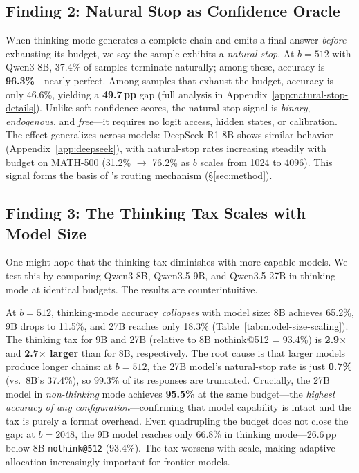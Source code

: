 \subsection{Finding 2: Natural Stop as Confidence Oracle}
\label{sec:finding:natural-stop}

When thinking mode generates a complete chain and emits a final answer \emph{before} exhausting its budget, we say the sample exhibits a \emph{natural stop}.
At $b{=}512$ with Qwen3-8B, 37.4\% of samples terminate naturally; among these, accuracy is \textbf{96.3\%}---nearly perfect.
Among samples that exhaust the budget, accuracy is only 46.6\%, yielding a \textbf{49.7\,pp} gap (full analysis in Appendix~\ref{app:natural-stop-details}).
Unlike soft confidence scores, the natural-stop signal is \emph{binary}, \emph{endogenous}, and \emph{free}---it requires no logit access, hidden states, or calibration.
The effect generalizes across models: DeepSeek-R1-8B shows similar behavior (Appendix~\ref{app:deepseek}), with natural-stop rates increasing steadily with budget on MATH-500 (31.2\% $\to$ 76.2\% as $b$ scales from 1024 to 4096).
This signal forms the basis of \method{}'s routing mechanism (\S\ref{sec:method}).

\subsection{Finding 3: The Thinking Tax Scales with Model Size}
\label{sec:finding:model-size}

One might hope that the thinking tax diminishes with more capable models.
We test this by comparing Qwen3-8B, Qwen3.5-9B, and Qwen3.5-27B in thinking mode at identical budgets.
The results are counterintuitive.



At $b{=}512$, thinking-mode accuracy \emph{collapses} with model size: 8B achieves 65.2\%, 9B drops to 11.5\%, and 27B reaches only 18.3\% (Table~\ref{tab:model-size-scaling}).
The thinking tax for 9B and 27B (relative to 8B nothink@512 = 93.4\%) is \textbf{2.9$\times$} and \textbf{2.7$\times$ larger} than for 8B, respectively.
The root cause is that larger models produce longer chains: at $b{=}512$, the 27B model's natural-stop rate is just \textbf{0.7\%} (vs.\ 8B's 37.4\%), so 99.3\% of its responses are truncated.
Crucially, the 27B model in \emph{non-thinking} mode achieves \textbf{95.5\%} at the same budget---the \emph{highest accuracy of any configuration}---confirming that model capability is intact and the tax is purely a format overhead.
Even quadrupling the budget does not close the gap: at $b{=}2048$, the 9B model reaches only 66.8\% in thinking mode---26.6\,pp below 8B \texttt{nothink@512} (93.4\%).
The tax worsens with scale, making adaptive allocation increasingly important for frontier models.


